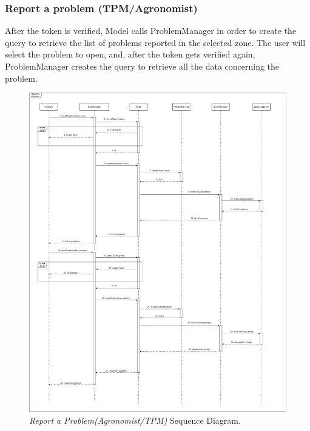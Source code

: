 \subsubsection{Report a problem (TPM/Agronomist)}
After the token is verified, Model calls ProblemManager in order to create the query to retrieve the list of problems reported in the selected zone. The user will select the problem to open, and, after the token gets verified again, ProblemManager creates the query to retrieve all the data concerning the problem.
\begin{figure}[H]
    \centering
    \includegraphics[width=\textwidth]{Images/Sequence Diagram/ReportProblemOthers.png}
    \caption{\textit{Report a Problem(Agronomist/TPM)} Sequence Diagram.}
\end{figure}
